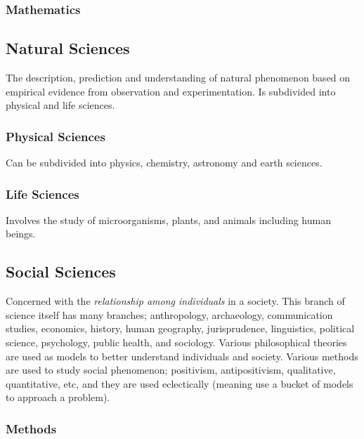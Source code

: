 \documentclass{article}
\begin{document}
\subsubsection{Mathematics}



\newpage

\subsection{Natural Sciences}

The description, prediction and understanding of natural phenomenon based on empirical evidence from observation and experimentation. Is subdivided into physical and life sciences. 

\newpage

\subsubsection{Physical Sciences}

Can be subdivided into physics, chemistry, astronomy and earth sciences. 

\newpage

\subsubsection{Life Sciences}

Involves the study of microorganisms, plants, and animals including human beings.

\newpage

\subsection{Social Sciences}

Concerned with the \textit{relationship among individuals} in a society. This branch of science itself has many branches; anthropology, archaeology, communication studies, economics, history, human geography, jurisprudence, linguistics, political science, psychology, public health, and sociology.
Various philosophical theories are used as models to better understand individuals and society. Various methods are used to study social phenomenon; positivism, antipositivism, qualitative, quantitative, etc, and they are used eclectically (meaning use a bucket of models to approach a problem). 

\newpage

\subsubsection{Methods} 
\end{document}
